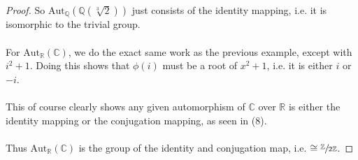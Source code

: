 \documentclass[12pt]{article}
\newenvironment{ex}[2][Exercise]{\begin{trivlist}
\item[\hskip \labelsep {\bfseries #1}\hskip \labelsep {\bfseries #2.}]}{\end{trivlist}}
\begin{document}
\begin{ex}{4}
\begin{enumerate}[label=(\alph*)]
\begin{proof}
            So $\text{Aut}_\mathbb{Q}(\mathbb{Q}(\sqrt[3]{2}))$ just consists of the identity mapping, i.e. it is isomorphic to the trivial group. \\ \\
            For $\text{Aut}_\mathbb{R}(\mathbb{C})$, we do the exact same work as the previous example, except with $i^2 + 1$. Doing this shows that $\phi(i)$ must be a root of $x^2 + 1$, i.e. it is either $i$ or $-i$. \\ \\
            This of course clearly shows any given automorphism of $\mathbb{C}$ over $\mathbb{R}$ is either the identity mapping or the conjugation mapping, as seen in (8).\\ \\
            Thus $\text{Aut}_{\mathbb{R}}(\mathbb{C})$ is the group of the identity and conjugation map, i.e. $\cong \sfrac{\mathbb{Z}}{2\mathbb{Z}}$.
        \end{proof}
    \end{enumerate}
\end{ex}
\end{document}
